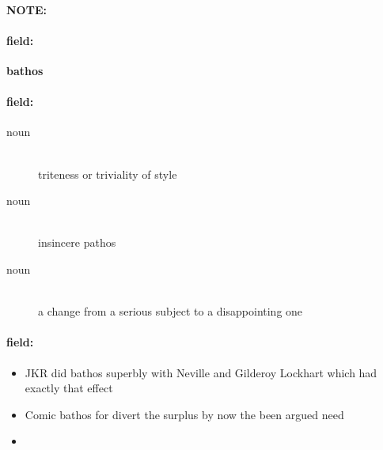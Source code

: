 \documentclass[12pt]{article}
\newenvironment{note}{\paragraph{NOTE:}}{}
\newenvironment{field}{\paragraph{field:}}{}
\begin{document}
\begin{note}
\begin{field}
\textbf{\large bathos}
\end{field}


\begin{field}
\begin{description}
\item[noun] \hfill \\ 
triteness or triviality of style

\item[noun] \hfill \\ 
insincere pathos

\item[noun] \hfill \\ 
a change from a serious subject to a disappointing one

\end{description}
\end{field}

\begin{field}
\begin{itemize}
\item JKR did bathos superbly with Neville and Gilderoy Lockhart which had exactly that effect
\item Comic bathos for divert the surplus by now the been argued need
\item 
\end{itemize}
\end{field}
\end{note}
\end{document}
